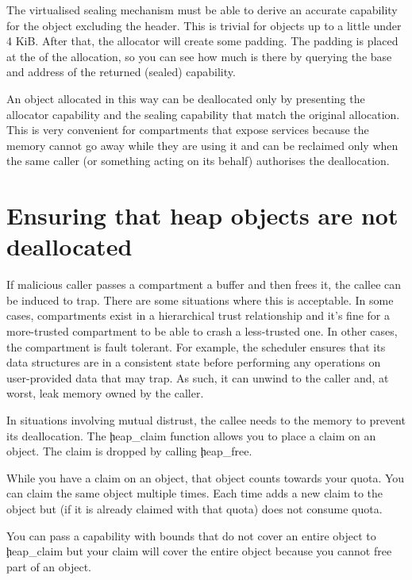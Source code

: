 \begin{note}
The virtualised sealing mechanism must be able to derive an accurate capability for the object excluding the header.
This is trivial for objects up to a little under 4 KiB.
After that, the allocator will create some padding.
The padding is placed at the  of the allocation, so you can see how much is there by querying the base and address of the returned (sealed) capability.
\end{note}

An object allocated in this way can be deallocated only by presenting  the allocator capability and the sealing capability that match the original allocation.
This is very convenient for compartments that expose services because the memory cannot go away while they are using it and can be reclaimed only when the same caller (or something acting on its behalf) authorises the deallocation.

\section[label=heap_claim]{Ensuring that heap objects are not deallocated}

If malicious caller passes a compartment a buffer and then frees it, the callee can be induced to trap.
There are some situations where this is acceptable.
In some cases, compartments exist in a hierarchical trust relationship and it's fine for a more-trusted compartment to be able to crash a less-trusted one.
In other cases, the compartment is fault tolerant.
For example, the scheduler ensures that its data structures are in a consistent state before performing any operations on user-provided data that may trap.
As such, it can unwind to the caller and, at worst, leak memory owned by the caller.

In situations involving mutual distrust, the callee needs to  the memory to prevent its deallocation.
The \c{heap_claim} function allows you to place a claim on an object.
The claim is dropped by calling \c{heap_free}.

While you have a claim on an object, that object counts towards your quota.
You can claim the same object multiple times. 
Each time adds a new claim to the object but (if it is already claimed with that quota) does not consume quota.

\begin{note}
You can pass a capability with bounds that do not cover an entire object to \c{heap_claim} but your claim will cover the entire object because you cannot free part of an object.
\end{note}

